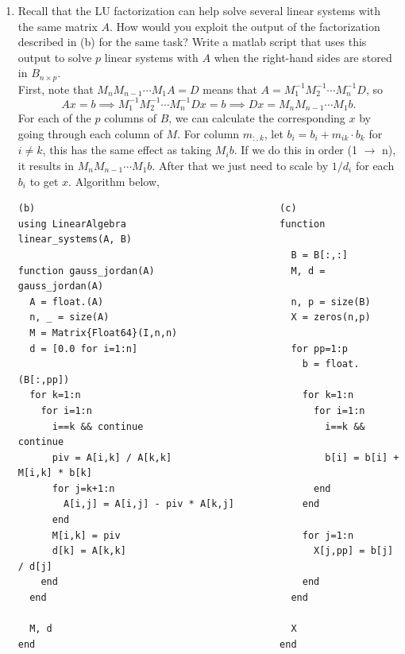 \documentclass[11pt]{article}
\newcommand{\n}{\vspace{0.3cm}}
\begin{document}
\begin{enumerate}
\begin{enumerate}
		      \item Recall that the LU factorization can help solve several linear systems with the same matrix \(A\).  How would you exploit the output of the factorization described in (b) for the same task?  Write a matlab script that uses this output to solve \(p\) linear systems with \(A\) when the right-hand sides are stored in \(B_{n \times p}\). \n\\
		            First, note that \(M_n M_{n-1} \cdots M_1 A = D\) means that \(A = M_1^{-1}M_2^{-1} \cdots M_n^{-1} D\), so
		            \[Ax = b \implies M_1^{-1}M_2^{-1} \cdots M_n^{-1} Dx = b \implies Dx = M_n M_{n-1} \cdots M_1 b.\]
		            For each of the \(p\) columns of \(B\), we can calculate the corresponding \(x\) by going through each column of \(M\).  For column \(m_{:,k}\), let \(b_i = b_i + m_{ik} \cdot b_k\) for \(i \neq k\), this has the same effect as taking \(M_i b\).  If we do this in order (1 \(\to\) n), it results in \(M_n M_{n-1} \cdots M_1 b\).  After that we just need to scale by \(1/d_i\) for each \(b_i\) to get \(x\).  Algorithm below,

		            \begin{verbatim}
(b)                                           (c)
using LinearAlgebra                           function linear_systems(A, B)
                                                B = B[:,:]
function gauss_jordan(A)                        M, d = gauss_jordan(A)
  A = float.(A)                                 n, p = size(B)
  n, _ = size(A)                                X = zeros(n,p)
  M = Matrix{Float64}(I,n,n)                
  d = [0.0 for i=1:n]                           for pp=1:p 
                                                  b = float.(B[:,pp])
  for k=1:n                                       for k=1:n 
    for i=1:n                                       for i=1:n 
      i==k && continue                                i==k && continue
      piv = A[i,k] / A[k,k]                           b[i] = b[i] + M[i,k] * b[k]
      for j=k+1:n                                   end
        A[i,j] = A[i,j] - piv * A[k,j]            end
      end                                   
      M[i,k] = piv                                for j=1:n
      d[k] = A[k,k]                                 X[j,pp] = b[j] / d[j]
    end                                           end
  end                                           end
                                            
  M, d                                          X
end                                           end
		            \end{verbatim}


\end{enumerate}
\end{enumerate}
\end{document}
